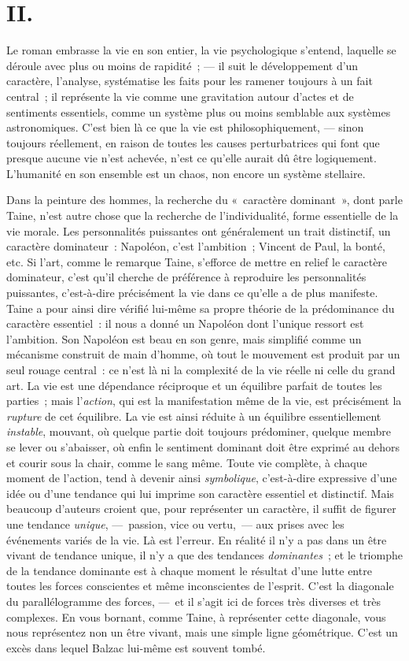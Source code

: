 \documentclass[french,twoside]{book} %
\begin{document}
\section[{II.}]{II.}
\noindent Le roman embrasse la vie en son entier, la vie psychologique s’entend, laquelle se déroule avec plus ou moins de rapidité ; — il suit le développement d’un caractère, l’analyse, systématise les faits pour les ramener toujours à un fait central ; il représente la vie comme une gravitation autour d’actes et de sentiments essentiels, comme un système plus ou moins semblable aux systèmes astronomiques. C’est bien là ce que la vie est philosophiquement, — sinon toujours réellement, en raison de toutes les causes perturbatrices qui font que presque aucune vie n’est achevée, n’est ce qu’elle aurait dû être logiquement. L’humanité en son ensemble est un chaos, non encore un système stellaire.\par
Dans la peinture des hommes, la recherche du « caractère dominant », dont parle Taine, n’est autre chose que la recherche de l’individualité, forme essentielle de la vie morale. Les personnalités puissantes ont généralement un trait distinctif, un caractère dominateur : Napoléon, c’est l’ambition ; Vincent de Paul, la bonté, etc. Si l’art, comme le remarque Taine, s’efforce de mettre en relief le caractère dominateur, c’est qu’il cherche de préférence à reproduire les personnalités puissantes, c’est-à-dire précisément la vie dans ce qu’elle a de plus manifeste. Taine a pour ainsi dire vérifié lui-même sa propre théorie de la prédominance du caractère essentiel : il nous a donné un Napoléon dont l’unique ressort est l’ambition. Son Napoléon est beau en son genre, mais simplifié comme un mécanisme construit de main d’homme, où tout le mouvement est produit par un seul rouage central : ce n’est là ni la complexité de la vie réelle ni celle du grand art. La vie est une dépendance réciproque et un équilibre parfait de toutes les parties ; mais l’\emph{action}, qui est la manifestation même de la vie, est précisément la \emph{rupture} de cet équilibre. La vie est ainsi réduite à un équilibre essentiellement \emph{instable}, mouvant, où quelque partie doit toujours prédominer, quelque membre se lever ou s’abaisser, où enfin le sentiment dominant doit être exprimé au dehors et courir sous la chair, comme le sang même. Toute vie complète, à chaque moment de l’action, tend à devenir ainsi \emph{symbolique}, c’est-à-dire expressive d’une idée ou d’une tendance qui lui imprime son caractère essentiel et distinctif. Mais beaucoup d’auteurs croient que, pour représenter un caractère, il suffit de figurer une tendance \emph{unique}, — passion, vice ou vertu, — aux prises avec les événements variés de la vie. Là est l’erreur. En réalité il n’y a pas dans un être vivant de tendance unique, il n’y a que des tendances \emph{dominantes} ; et le triomphe de la tendance dominante est à chaque moment le résultat d’une lutte entre toutes les forces conscientes et même inconscientes de l’esprit. C’est la diagonale du parallélogramme des forces, — et il s’agit ici de forces très diverses et très complexes. En vous bornant, comme Taine, à représenter cette diagonale, vous nous représentez non un être vivant, mais une simple ligne géométrique. C’est un excès dans lequel Balzac lui-même est souvent tombé.\par
\end{document}
